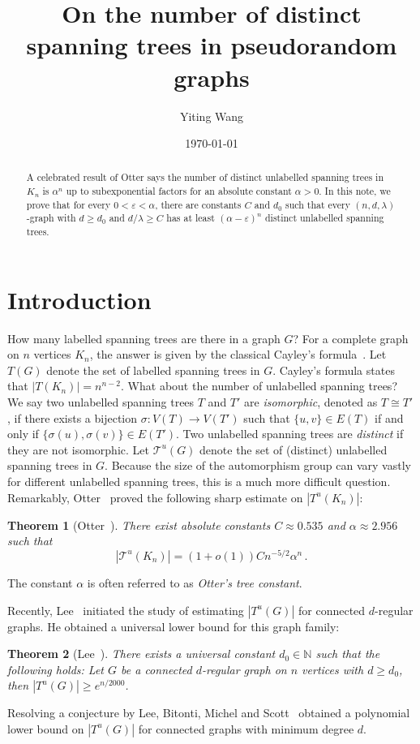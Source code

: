 \documentclass[reqno,final,a4paper]{amsart}
\title{On the number of distinct spanning trees in pseudorandom graphs}
\author{Yiting Wang}\address{Institute of Science and Technology Austria,~Klosterneuburg,~3400,~Austria.}\email{yiting.wang@ist.ac.at}
\date{\today}
\numberwithin{equation}{section}
\newtheorem{theorem}{Theorem}[section]
\theoremstyle{definition}
\theoremstyle{remark}
\newcommand{\eps}{\varepsilon}
\begin{document}
\begin{abstract}
A celebrated result of Otter says the number of distinct unlabelled spanning trees in $K_n$ is $\alpha^n$ up to subexponential factors for an absolute constant $\alpha>0$.
In this note, we prove that for every $0<\varepsilon<\alpha$, there are constants $C$ and $d_0$ such that every $(n,d,\lambda)$-graph with $d\geq d_0$ and $d/\lambda \geq C$ has at least $(\alpha-\eps)^n$ distinct unlabelled spanning trees.
\end{abstract}
\maketitle

\section{Introduction}
How many labelled spanning trees are there in a graph $G$? For a complete graph on $n$ vertices $K_n$, the answer is given by the classical Cayley's formula~\cite{Cayley}. Let $T(G)$ denote the set of labelled spanning trees in $G$. Cayley's formula states that $|T(K_n)| = n^{n-2}$. What about the number of unlabelled spanning trees? 
We say two unlabelled spanning trees $T$ and $T'$ are \emph{isomorphic}, denoted as $T\cong T'$, if there exists a bijection $\sigma:V(T)\rightarrow V(T')$ such that $\{u,v\}\in E(T)$ if and only if $\{\sigma(u), \sigma(v)\}\in E(T')$. 
Two unlabelled spanning trees are \emph{distinct} if they are not isomorphic.
Let $\mathcal T^u(G)$ denote the set of (distinct) unlabelled spanning trees in $G$. Because the size of the automorphism group can vary vastly for different unlabelled spanning trees, this is a much more difficult question. Remarkably, Otter~\cite{Otter} proved the following sharp estimate on $|T^u(K_n)|$:
\begin{theorem}[Otter~\cite{Otter}]\label{thm:Otter}
    There exist absolute constants $C \approx 0.535$ and $\alpha \approx 2.956$ such that 
    \[
        |\mathcal T^u(K_n)| = (1+o(1))Cn^{-5/2} \alpha^n\,.
    \]
\end{theorem}
The constant $\alpha$ is often referred to as \emph{Otter's tree constant}.

Recently, Lee~\cite{Lee} initiated the study of estimating $|T^u(G)|$ for connected $d$-regular graphs. He obtained a universal lower bound for this graph family:
\begin{theorem}[{Lee~\cite[Theorem 1.4]{Lee}}]\label{thm:Lee}
    There exists a universal constant $d_0\in \mathbb N$ such that the following holds: Let $G$ be a connected $d$-regular graph on $n$ vertices with $d \geq d_0$, then $|T^u(G)|\geq e^{n/2000}$.
\end{theorem}
Resolving a conjecture by Lee, Bitonti, Michel and Scott~\cite{Bitonti-Michel-Scott} obtained a polynomial lower bound on $|T^u(G)|$ for connected graphs with minimum degree $d$.
\end{document}
